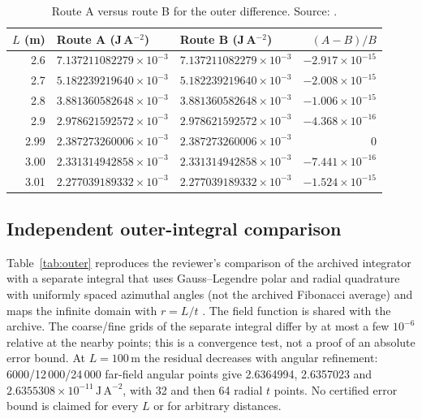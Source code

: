 \documentclass[12pt,a4paper]{article}
\newcommand{\e}[1]{\times10^{#1}}
\newcommand{\filec}[1]{\texttt{\detokenize{#1}}}
\begin{document}
\begin{table}[t]
\centering
\caption{Route A versus route B for the outer difference. Source: \filec{csv/continuity_test.csv}.}
\label{tab:cont}
\small
\begin{tabular}{rllr}
\toprule
$L$ (m) & Route A (J\,A$^{-2}$) & Route B (J\,A$^{-2}$) & $(A-B)/B$\\
\midrule
2.6  & $7.137211082279\e{-3}$ & $7.137211082279\e{-3}$ & $-2.917\e{-15}$\\
2.7  & $5.182239219640\e{-3}$ & $5.182239219640\e{-3}$ & $-2.008\e{-15}$\\
2.8  & $3.881360582648\e{-3}$ & $3.881360582648\e{-3}$ & $-1.006\e{-15}$\\
2.9  & $2.978621592572\e{-3}$ & $2.978621592572\e{-3}$ & $-4.368\e{-16}$\\
2.99 & $2.387273260006\e{-3}$ & $2.387273260006\e{-3}$ & $0$\\
3.00 & $2.331314942858\e{-3}$ & $2.331314942858\e{-3}$ & $-7.441\e{-16}$\\
3.01 & $2.277039189332\e{-3}$ & $2.277039189332\e{-3}$ & $-1.524\e{-15}$\\
\bottomrule
\end{tabular}
\end{table}

\subsection{Independent outer-integral comparison}
Table~\ref{tab:outer} reproduces the reviewer's comparison of the archived integrator with a separate integral
that uses Gauss--Legendre polar and radial quadrature with uniformly spaced azimuthal angles (not the archived
Fibonacci average) and maps the infinite domain with $r=L/t$ \cite{TAL_V20}. The field function is shared with the
archive. The coarse/fine grids of the separate integral differ by at most a few $10^{-6}$ relative at the nearby points;
this is a convergence test, not a proof of an absolute error bound. At $L=100$\,m the residual decreases with
angular refinement: 6000/12\,000/24\,000 far-field angular points give 2.6364994, 2.6357023 and
$2.6355308\times10^{-11}\,\mathrm{J\,A^{-2}}$, with 32 and then 64 radial $t$ points. No certified error bound is
claimed for every $L$ or for arbitrary distances.
\end{document}
